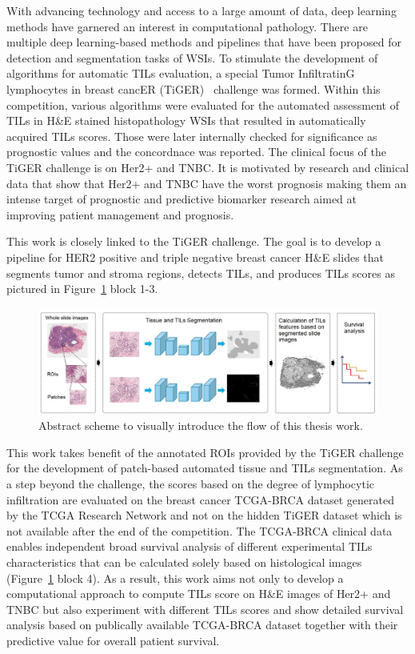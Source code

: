 With advancing technology and access to a large amount of data, deep learning
methods have garnered an interest in computational pathology. 
There are multiple deep learning-based methods and pipelines that have been
proposed for detection and segmentation tasks of WSIs. 
To stimulate the development of algorithms for automatic TILs evaluation,
a special Tumor InfiltratinG lymphocytes in breast cancER (TiGER)~\cite{shephard2022tiager}
challenge was formed. Within this competition, various algorithms were
evaluated for the automated assessment of TILs in H\&E stained
histopathology WSIs that resulted in automatically acquired TILs scores.
Those were later internally checked for significance as prognostic values
and the concordnace was reported.
The clinical focus of the TiGER challenge is on Her2+ and TNBC.
It is motivated by research and clinical data that show that Her2+
and TNBC have the worst prognosis making them an intense target of
prognostic and predictive biomarker research aimed at improving patient
management and prognosis.

This work is closely linked to the TiGER challenge. The goal is to develop a pipeline
for HER2 positive and triple negative breast cancer H\&E slides
that segments tumor and stroma regions, detects TILs, and produces TILs scores
as pictured in Figure~\ref*{fig:workflow} block 1-3.
\begin{figure}[H]
    \includegraphics[width=\linewidth]{figures/overview.jpg}
    \caption{Abstract scheme to visually introduce the flow of this thesis work.}
    \label{fig:workflow}
\end{figure}
This work takes benefit of the annotated ROIs provided by the TiGER challenge
for the development of patch-based automated tissue and TILs segmentation.
As a step beyond the challenge, the scores based on the degree of lymphocytic
infiltration are evaluated on the breast cancer TCGA-BRCA dataset generated by
the TCGA Research Network and not on the hidden TiGER dataset which is not available
after the end of the competition.
The TCGA-BRCA clinical data enables independent broad survival analysis of different experimental
TILs characteristics that can be calculated solely based on histological images (Figure~\ref*{fig:workflow} block 4). 
As a result, this work aims not only to develop a computational approach
to compute TILs score on H\&E images of Her2+ and TNBC but also experiment
with different TILs scores and show detailed survival analysis based on publically available
TCGA-BRCA dataset together with their predictive value for overall patient survival. 
